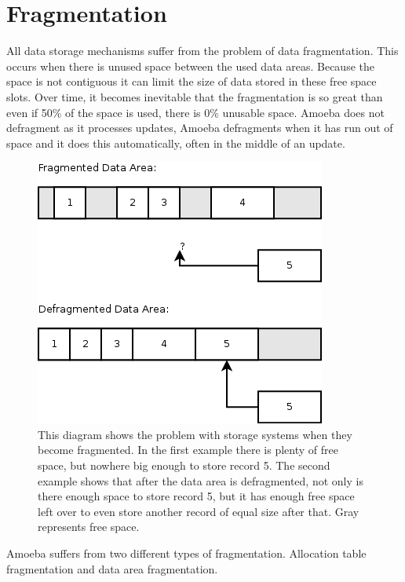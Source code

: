 \documentclass[11pt]{article}
\begin{document}
\section{Fragmentation}
All data storage mechanisms suffer from the problem of data fragmentation. This occurs when there is unused space between the used data areas. Because the space is not contiguous it can limit the size of data stored in these free space slots. Over time, it becomes inevitable that the fragmentation is so great than even if 50\% of the space is used, there is 0\% unusable space. Amoeba does not defragment as it processes updates, Amoeba defragments when it has run out of space and it does this automatically, often in the middle of an update.
\begin{figure}[ht]
\centering
\includegraphics[scale=0.5]{Fragmentation1.png}
\caption{This diagram shows the problem with storage systems when they become fragmented. In the first example there is plenty of free space, but nowhere big enough to store record 5. The second example shows that after the data area is defragmented, not only is there enough space to store record 5, but it has enough free space left over to even store another record of equal size after that. Gray represents free space.}
\end{figure}
\newline
Amoeba suffers from two different types of fragmentation. Allocation table fragmentation and data area fragmentation. 
\end{document}
